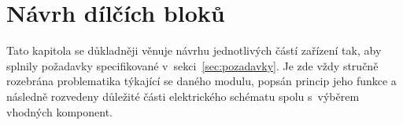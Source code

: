 \chapter{Návrh dílčích bloků}
\label{kap:navrh-dilnich-bloku}
    Tato kapitola se důkladněji věnuje návrhu jednotlivých částí zařízení tak, aby splnily požadavky specifikované v~sekci~\ref{sec:pozadavky}. Je zde vždy stručně rozebrána problematika týkající se daného modulu, popsán princip jeho funkce a následně rozvedeny důležité části elektrického schématu spolu s~výběrem vhodných komponent.













